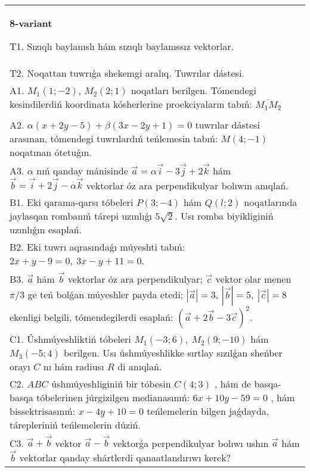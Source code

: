 \documentclass{article}
\begin{document}
\begin{tabular}{m{17cm}}
\textbf{8-variant}
\newline

T1. 
Sızıqlı baylanıslı hám sızıqlı baylanıssız vektorlar.
 \\
T2. 
Noqattan tuwrıǵa shekemgi aralıq. Tuwrılar dástesi.
 \\
A1. $M_1(1; -2)$, $M_2(2; 1)$ noqatları berilgen. 
Tómendegi kesindilerdiń koordinata kósherlerine proekciyaların tabıń: $\overline{M_1M_2}$ \\
 \\
A2. 
$\alpha(x+2y-5)+\beta(3x-2y+1)=0$ tuwrılar
dástesi arasınan, tómendegi tuwrılardıń teńlemesin tabıń:
$M(4;-1)$ noqatınan ótetuǵın.
 \\
A3. 
$\alpha$
nıń qanday mánisinde
$\overrightarrow{a} = \alpha\overrightarrow{i} - 3\overrightarrow{j} + 2\overrightarrow{k}$
hám
$\overrightarrow{b} = \overrightarrow{i} + 2\overrightarrow{j} - \alpha\overrightarrow{k}$
vektorlar óz ara perpendikulyar bolıwın anıqlań. 
 \\
B1. 
Eki qarama-qarsı tóbeleri $P(3; -4)$ hám $Q(l;2)$ noqatlarında jaylasqan rombanıń tárepi uzınlıǵı \(5\sqrt{2}\). Usı romba biyikliginiń uzınlıǵın esaplań.
 \\
B2. 
Eki tuwrı aqrasındaǵı múyeshti tabıń: $2x+y-9=0,\ 3x-y+11=0$.
 \\
B3. 
$\vec{a}$ hám $\vec{b}$ vektorlar óz ara perpendikulyar; $\vec{c}$ vektor olar menen $\pi/3$ ge teń bolǵan múyeshler payda etedi; $|\vec{a}| = 3$, $|\vec{b}| = 5,\ |\vec{c}| = 8$ ekenligi belgili, tómendegilerdi esaplań: 
$(\vec{a} + 2\vec{b} - 3\vec{c}) ^{2}$.
 \\
C1. 
Úshmúyeshliktiń tóbeleri \(M_{1}( - 3;6),\ M_{2}(9; - 10)\) 
hám \(M_{3}( - 5;4)\) berilgen. Usı úshmúyeshlikke sırtlay sızılǵan
sheńber orayı $C$ nı hám radiusı $R$ di anıqlań.
 \\
C2. 
$ABC$ úshmúyeshliginiń bir tóbesin \(C(4;3)\) , hám de
basqa-basqa tóbelerinen júrgizilgen medianasınıń:
\(6x + 10y - 59 = 0\) , hám bissektrisasınıń: \(x - 4y + 10 = 0\) 
teńlemelerin bilgen jaǵdayda, tárepleriniń teńlemelerin dúziń.
 \\
C3. 
\(\vec{a} + \vec{b}\) vektor \(\vec{a} - \vec{b}\) vektorǵa perpendikulyar bolıwı ushın \(\vec{a}\) hám \(\vec{b}\) vektorlar qanday shártlerdi qanaatlandırıwı kerek?
 \\

\end{tabular}
\vspace{1cm}
\end{document}
